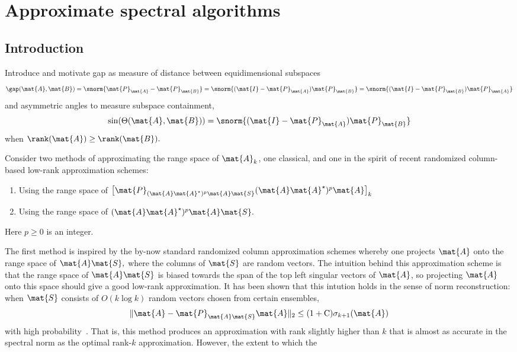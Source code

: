 
\chapter{Approximate spectral algorithms}
\label{ch5}

\section{Introduction}

Introduce and motivate gap as measure of distance between equidimensional
subspaces
\[
\gap(\mat{A}, \mat{B}) = \snorm{\mat{P}_{\mat{A}} - \mat{P}_{\mat{B}}} =
\snorm{(\mat{I} - \mat{P}_{\mat{A}})\mat{P}_{\mat{B}}} = \snorm{(\mat{I} -
\mat{P}_{\mat{B}})\mat{P}_{\mat{A}}}
\]
and asymmetric angles to measure subspace containment,
\[
\sin(\Theta(\mat{A}, \mat{B})) =\snorm{(\mat{I} -
\mat{P}_{\mat{A}})\mat{P}_{\mat{B}}}
\]
when $\rank(\mat{A}) \geq \rank(\mat{B}).$

Consider two methods of approximating the range space of $\mat{A}_k$, one
classical, and one in the spirit of recent randomized column-based low-rank
approximation schemes:
\begin{enumerate}
\item Using the range space of $\big[\mat{P}_{(\mat{A}\mat{A}^\star)^p \mat{A}
\mat{S}} (\mat{A}\mat{A}^\star)^p \mat{A}\big]_k$
\item Using the range space of $(\mat{A} \mat{A}^\star)^p \mat{A} \mat{S}.$
\end{enumerate}
Here $p \geq 0$ is an integer. 

The first method is inspired by the by-now standard randomized column
approximation schemes whereby one projects $\mat{A}$ onto the range space of
$\mat{A} \mat{S},$ where the columns of $\mat{S}$ are random vectors. The
intuition behind this approximation scheme is that the range space of $\mat{A}
\mat{S}$ is biased towards the span of the top left singular vectors of
$\mat{A}$, so projecting $\mat{A}$ onto this space should give a good low-rank
approximation. It has been shown that this intution holds in the sense of norm
reconstruction: when $\mat{S}$ consists of $O(k \log k)$ random vectors chosen
from certain ensembles, 
\[
\|\mat{A} - \mat{P}_{\mat{A}\mat{S}} \mat{A}\|_2 \leq (1 + \mathrm{C})
\sigma_{k+1}(\mat{A})
\]
with high probability~\cite{}. That is, this method produces an approximation
with rank slightly higher than $k$ that is almost as accurate in the spectral
norm as the optimal rank-$k$ approximation. However, the extent to which the 

